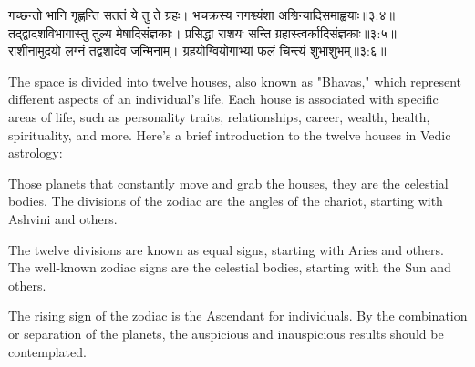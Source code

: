 \begin{sanskrit}
	\begin{center}
		गच्छन्तो भानि गृह्णन्ति सततं ये तु ते ग्रहः।
		भचक्रस्य नगश्व्यंशा अश्विन्यादिसमाह्वयाः॥३:४॥\cite{BrihatParasharHoraShastraVol1, wiki:bphs}\label{Dictum1}\\
		तद्‌द्वादशविभागास्तु तुल्य मेषादिसंज्ञकाः।
		प्रसिद्धा राशयः सन्ति ग्रहास्त्वर्कादिसंज्ञकाः॥३:५॥\cite{BrihatParasharHoraShastraVol1, wiki:bphs}\label{Dictum2}\\
		राशीनामुदयो लग्नं तद्वशादेव जन्मिनाम्‌।
		ग्रहयोग्वियोगाभ्यां फलं चिन्त्यं शुभाशुभम्‌॥३:६॥\cite{BrihatParasharHoraShastraVol1, wiki:bphs}\label{Dictum3}\\
	\end{center}
\end{sanskrit}
The space is divided into twelve houses, also known as "Bhavas," which represent different aspects of an individual's life. Each house is associated with specific areas of life, such as personality traits, relationships, career, wealth, health, spirituality, and more. Here's a brief introduction to the twelve houses in Vedic astrology:

Those planets that constantly move and grab the houses, they are the celestial bodies. The divisions of the zodiac are the angles of the chariot, starting with Ashvini and others.

The twelve divisions are known as equal signs, starting with Aries and others. The well-known zodiac signs are the celestial bodies, starting with the Sun and others.

The rising sign of the zodiac is the Ascendant for individuals. By the combination or separation of the planets, the auspicious and inauspicious results should be contemplated.

